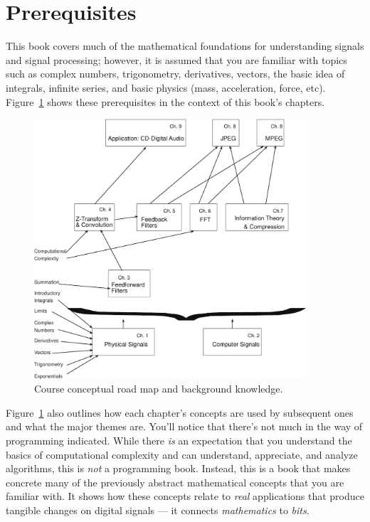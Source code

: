 \section*{Prerequisites}

This book covers much of the mathematical foundations for
understanding signals and signal processing; however, it is assumed
that you are familiar with topics such as complex numbers,
trigonometry, derivatives, vectors, the basic idea of integrals,
infinite series, and basic physics (mass, acceleration, force,
etc). Figure~\ref{fg:roadmap} shows these prerequisites in the context
of this book's chapters.

\begin{figure}
\vspace{2in}
\centerline{\includegraphics[width=0.9\textwidth]{roadmap}}
\caption[Course conceptual road map]{Course conceptual road
map and background knowledge.\label{fg:roadmap}}
\end{figure}

Figure~\ref{fg:roadmap} also outlines how each chapter's concepts are
used by subsequent ones and what the major themes are. You'll notice
that there's not much in the way of programming indicated. While there
\emph{is} an expectation that you understand the basics of
computational complexity and can understand, appreciate, and analyze
algorithms, this is \emph{not} a programming book. Instead, this is a
book that makes concrete many of the previously abstract mathematical
concepts that you are familiar with. It shows how these concepts
relate to \emph{real} applications that produce tangible changes on
digital signals --- it connects \emph{mathematics} to \emph{bits}.

